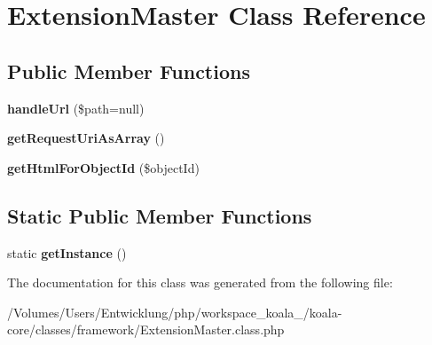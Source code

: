 \hypertarget{class_extension_master}{
\section{ExtensionMaster Class Reference}
\label{class_extension_master}
}
\subsection*{Public Member Functions}
\begin{DoxyCompactItemize}
\item 
\hypertarget{class_extension_master_aa83ec1f8e3c0769c84a7a2849ff0f15a}{
{\bfseries handleUrl} (\$path=null)}
\label{class_extension_master_aa83ec1f8e3c0769c84a7a2849ff0f15a}

\item 
\hypertarget{class_extension_master_a456ec125e7ee75e2945866bba11d945f}{
{\bfseries getRequestUriAsArray} ()}
\label{class_extension_master_a456ec125e7ee75e2945866bba11d945f}

\item 
\hypertarget{class_extension_master_acf2498df23f10462f62afc8d75e2d08b}{
{\bfseries getHtmlForObjectId} (\$objectId)}
\label{class_extension_master_acf2498df23f10462f62afc8d75e2d08b}

\end{DoxyCompactItemize}
\subsection*{Static Public Member Functions}
\begin{DoxyCompactItemize}
\item 
\hypertarget{class_extension_master_aa585f74810f743cef069729a80e03b6d}{
static {\bfseries getInstance} ()}
\label{class_extension_master_aa585f74810f743cef069729a80e03b6d}

\end{DoxyCompactItemize}


The documentation for this class was generated from the following file:\begin{DoxyCompactItemize}
\item 
/Volumes/Users/Entwicklung/php/workspace\_\-koala\_/koala-\/core/classes/framework/ExtensionMaster.class.php\end{DoxyCompactItemize}
